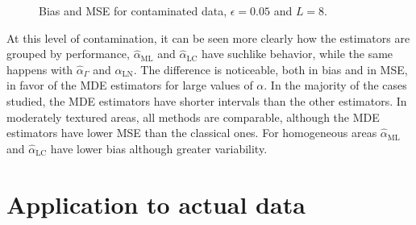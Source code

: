 \documentclass[twocolumn]{svjour3}
\begin{document}
\begin{figure}[hbt]
	\centering
	\caption{Bias and MSE for contaminated data,  $\epsilon=0.05$ and $ L=8$.}\label{SesgoyECMConContL=8} 
\end{figure}

At this level of contamination, it can be seen more clearly how the estimators are grouped by performance, $\widehat{\alpha}_{\text{{ML}}}$ and $\widehat{\alpha}_{\text{{LC}}}$ have suchlike behavior, while the same happens with $\widehat{\alpha}_{\Gamma}$ and $\widehat{\alpha}_{\text{{LN}}}$.  
The difference is noticeable, both in bias and in MSE, in favor of the MDE estimators for large values of $\alpha$. 
In the majority of the cases studied, the MDE estimators have shorter intervals than the other estimators. 
In moderately textured areas, all methods are comparable, although the MDE estimators have lower MSE than the classical ones. 
For homogeneous areas $\widehat{\alpha}_{\text{{ML}}}$ and $\widehat{\alpha}_{\text{{LC}}}$ have lower bias although greater variability.

\section{Application to actual data}
\label{application}
\end{document}
